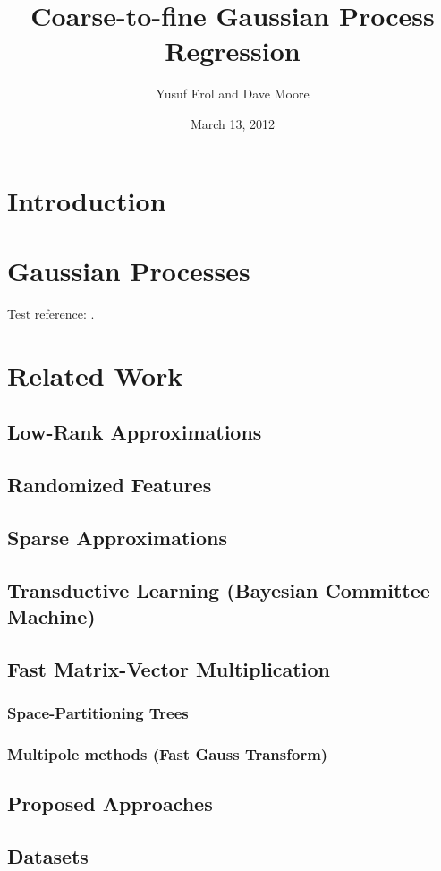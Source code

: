 \documentclass{article}
\begin{document}
\title{Coarse-to-fine Gaussian Process Regression}
\author{Yusuf Erol and Dave Moore}
\date{March 13, 2012}
\maketitle

\section{Introduction}

\section{Gaussian Processes}

Test reference: \cite{rasmussen06}. 

\section{Related Work}

\subsection{Low-Rank Approximations}

\subsection{Randomized Features}

\subsection{Sparse Approximations}

\subsection{Transductive Learning (Bayesian Committee Machine)}

\subsection{Fast Matrix-Vector Multiplication}

\subsubsection{Space-Partitioning Trees}
\subsubsection{Multipole methods (Fast Gauss Transform)}

\subsection{Proposed Approaches}

\subsection{Datasets}



\end{document}
